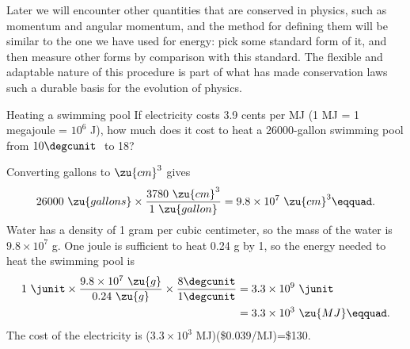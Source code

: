 Later we will encounter other quantities that are conserved
in physics, such as momentum and angular momentum, and the
method for defining them will be similar to the one we have
used for energy: pick some standard form of it, and then
measure other forms by comparison with this standard. The
flexible and adaptable nature of this procedure is part of
what has made conservation laws such a durable basis for the
evolution of physics.

\begin{eg}{Heating a swimming pool}
\egquestion If electricity costs 3.9 cents per MJ (1 MJ = 1
megajoule = $10^6$ J), how much does it cost to heat a
26000-gallon swimming pool from $10\degcunit\ $ to 18\degcunit?

\eganswer Converting gallons to $\zu{cm}^3$ gives
\begin{equation*}
        26000\ \zu{gallons} \times \frac{3780\ \zu{cm}^3}{1\ \zu{gallon}}
            =  9.8\times10^7\ \zu{cm}^3\eqquad.
\end{equation*}
Water has a density of 1 gram per cubic centimeter, so the
mass of the water is $9.8\times10^7$ g. One joule is
sufficient to heat 0.24 g by 1\degcunit, so the energy needed
to heat the swimming pool is
\begin{align*}
 1\ \junit \times \frac{9.8\times10^7\ \zu{g}}{0.24\ \zu{g}} \times \frac{8\degcunit}{1\degcunit}
 &= 3.3\times10^9\ \junit \\
 &= 3.3\times10^3\ \zu{MJ}\eqquad.
\end{align*}
The cost of the electricity is ($3.3\times10^3$ MJ)(\$0.039/MJ)=\$130.
\end{eg}

